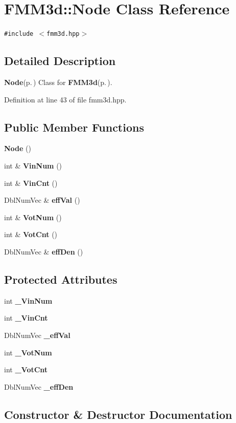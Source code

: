 \section{FMM3d::Node Class Reference}
\label{classFMM3d_1_1Node}
{\tt \#include $<$fmm3d.hpp$>$}



\subsection{Detailed Description}
{\bf Node}{\rm (p.\,\pageref{classFMM3d_1_1Node})} Class for {\bf FMM3d}{\rm (p.\,\pageref{classFMM3d})}. 



Definition at line 43 of file fmm3d.hpp.\subsection*{Public Member Functions}
\begin{CompactItemize}
\item 
{\bf Node} ()
\item 
int \& {\bf Vin\-Num} ()
\item 
int \& {\bf Vin\-Cnt} ()
\item 
Dbl\-Num\-Vec \& {\bf eff\-Val} ()
\item 
int \& {\bf Vot\-Num} ()
\item 
int \& {\bf Vot\-Cnt} ()
\item 
Dbl\-Num\-Vec \& {\bf eff\-Den} ()
\end{CompactItemize}
\subsection*{Protected Attributes}
\begin{CompactItemize}
\item 
int {\bf \_\-Vin\-Num}
\item 
int {\bf \_\-Vin\-Cnt}
\item 
Dbl\-Num\-Vec {\bf \_\-eff\-Val}
\item 
int {\bf \_\-Vot\-Num}
\item 
int {\bf \_\-Vot\-Cnt}
\item 
Dbl\-Num\-Vec {\bf \_\-eff\-Den}
\end{CompactItemize}


\subsection{Constructor \& Destructor Documentation}
